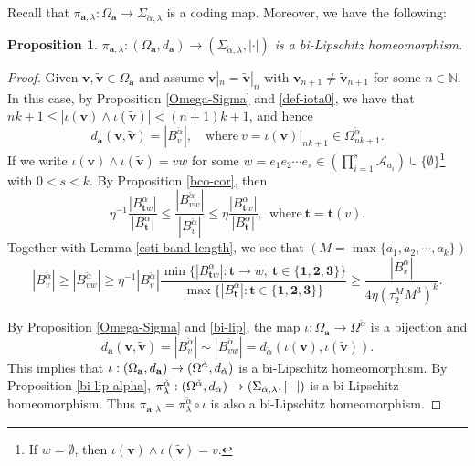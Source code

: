 \documentclass[reqno,11pt,graphicx,]{amsart}
\numberwithin{equation}{section}
\theoremstyle{plain}
\newcommand{\N}{{\mathbb N}}
\newcommand{\3}{\mathbf{3}}
\newcommand{\ma}{\mathbf{a}}
\newcommand{\mv}{\mathbf{v}}
\newtheorem{proposition}[theorem]{Proposition}
\begin{document}
	Recall that $\pi_{\ma,\lambda}:
	\Omega_{\ma}\to\Sigma_{\check{\alpha},\lambda}$ is a coding map. Moreover, we have the following:
	\begin{proposition}\label{bi-Lip} 
		$\pi_{\ma,\lambda}:(\Omega_{\mathbf{a}%
		},d_{\ma})\to(\Sigma_{\check{\alpha},\lambda},|\cdot|)$ is a bi-Lipschitz
		homeomorphism.
	\end{proposition}	
	\begin{proof}
		Given $\mv,\tilde{\mv}\in\Omega_{\ma}$
		and assume $\mv|_n=\tilde{\mv}|_n$ with $\mv_{n+1}\neq%
		\tilde{\mv}_{n+1}$ for some $n\in\N$. In this case, by Proposition \ref{Omega-Sigma} and \eqref{def-iota0}, we have that $nk+1\leq|\iota(\mv)\wedge\iota(\tilde{\mv})|<(n+1)k+1$, and hence
		$$d_{\ma}(\mv,\tilde{\mathbf{v
		}})=|B^{\check{\alpha}}_{v}|,\quad\text{where}\ v=\iota(\mv)|_{nk+1}\in\Omega^{\check{\alpha}}_{nk+1}.$$
		If we write $\iota(\mv)\wedge\iota(\tilde{\mv})=vw$ for some $w=e_1e_2\cdots e_s\in(\prod_{i=1}^{s}\mathscr{A}_{a_i})\cup\{\emptyset\}$\footnote{If $w=\emptyset$, then $\iota(\mv)\wedge\iota(\tilde{\mv})=v$.} with $0<s<k$. By Proposition \ref{bco-cor}, then 
		\begin{equation*}
			\eta^{-1} \frac{|{B}_{\mathbf{t}w}^{\alpha}|}{|{B}_{\mathbf{t}}^{\alpha}|}%
			\le \frac{|B_{vw}^{\check{\alpha}}|}{|B_{v}^{\check{\alpha}}|%
			}\le \eta \frac{|{B}_{\mathbf{t}w}^{\alpha}|}{|{B}_{\mathbf{t}}^{\alpha}|},\ \ \text{where}\ \mathbf{t}=\mathbf{t}(v).
		\end{equation*}
		Together with Lemma \ref{esti-band-length}, we see that $(M=\max\{a_1,a_2,\cdots,a_k\})$
		\begin{equation}\label{bi-lip}
			|B^{\check{\alpha}}_v|\geq|B_{vw}^{\check{\alpha}}|\geq\eta^{-1}|B_{v}^{\check{\alpha}}|\frac{\min\{|B^{\alpha}_{\mathbf{t}w}|:\mathbf{t}\to w,\ \mathbf{t}\in\{\mathbf{1},\mathbf{2},\mathbf{3}\}\}}{\max\{|B^{\alpha}_{\mathbf{t}}|:\mathbf{t}\in\{\mathbf{1},\mathbf{2},\mathbf{3}\}\}}\geq\frac{|B_{v}^{\check{\alpha}}|}{4\eta(\tau_2^MM^3)^k}.
		\end{equation}
		
		By Proposition \ref{Omega-Sigma} and \eqref{bi-lip}, the map $%
		\iota:\Omega_{\ma}\to\Omega^{\check{\alpha}}$ is a bijection and 
		\begin{equation*}
			d_{\ma}(\mv,\tilde{\mv})=|B^{\check{\alpha}}_{v}|\sim|B^{\check{\alpha}}_{vw}|=d_{\check{\alpha}}(\iota(\mv),\iota(\tilde{\mv})).
		\end{equation*}
		This implies that $\iota:(\Omega_{\ma},d_{\ma})\to(\Omega^{\check{%
				\alpha}},d_{\check{\alpha}})$ is a bi-Lipschitz homeomorphism. By Proposition \ref{bi-lip-alpha}, $\pi_{\lambda}^{\check{\alpha}}:(\Omega^{\check{\alpha}},d_{\check{\alpha}})\to(\Sigma_{\check{%
				\alpha},\lambda},|\cdot|)$ is a bi-Lipschitz homeomorphism. Thus $%
		\pi_{\ma,\lambda}=\pi^{\check{\alpha}}_{\lambda}\circ\iota$ is also a
		bi-Lipschitz homeomorphism.
	\end{proof}
	
\end{document}
